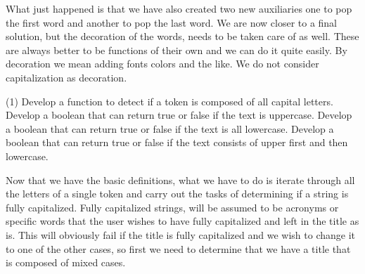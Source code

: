 What just happened is that we have also created two new auxiliaries one to pop the first word and another to pop the last word. We are now closer to a final solution, but the decoration of the words, needs to be taken care of as well. These are always better to be functions of their own and we can do it quite easily. By decoration we mean adding fonts colors and the like. We do not consider capitalization as decoration. 


\begin{question}
\begin{tasks}(1)
\task Develop a function to detect if a token is composed of all capital letters.
\task Develop a boolean  that can return true or false if the text is uppercase.
\task Develop a boolean  that can return true or false if the text is all lowercase.
\task Develop a boolean  that can return true or false if the text consists of upper first and then lowercase.
\end{tasks}
\end{question}


Now that we have the basic definitions, what we have to do is iterate through all the letters of a single
token and carry out the tasks of determining if a string is fully capitalized. Fully capitalized strings,
will be assumed to be acronyms or specific words that the user wishes to have fully capitalized and left in the title as is. This will obviously fail if the title is fully capitalized and we wish to change it to one of the other cases, so first we need to determine that we have a title that is composed of mixed cases.

